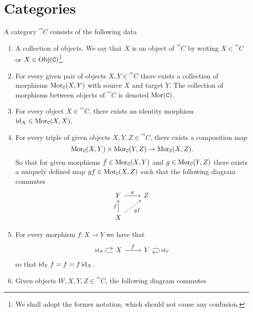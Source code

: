 \section{Categories}

\begin{definition}[Category]\label{def: category}
    A category \(\cat C\) consists of the following data
    \begin{enumerate}[(C1)]
        \item A collection of objects. We say that \(X\) is an object of \(\cat C\)
              by writing \(X \in \cat C\) or \(X \in \operatorname{Obj}(\texttt C)\)\footnote{We shall adopt
                  the former notation, which should not cause any confusion.}.
        \item For every given pair of objects \(X, Y \in \cat C\) there exists a
              collection of morphisms \(\operatorname{Mor}_{\texttt C}(X, Y)\) with source \(X\) and
              target \(Y\). The collection of morphisms between objects of \(\cat C\) is
              denoted \(\operatorname{Mor}(\texttt C)\).
        \item For every object \(X \in \cat C\), there exists an identity morphism
              \(\operatorname{id}_X \in \operatorname{Mor}_{\texttt C}(X, X)\).
        \item For every triple of given objects \(X, Y, Z \in \cat C\), there exists
              a composition map
              \[
                  \operatorname{Mor}_{\texttt C}(X, Y) \times \operatorname{Mor}_{\texttt C}(Y, Z) \to \operatorname{Mor}_{\texttt C}(X, Z).
              \]
              So that for given morphisms \(f \in \operatorname{Mor}_{\texttt C}(X, Y)\) and \(g \in
              \operatorname{Mor}_{\texttt C}(Y, Z)\) there exists a uniquely defined map \(g  f \in
              \operatorname{Mor}_{\texttt C}(X, Z)\) such that the following diagram commutes
              \[
                  \begin{tikzcd}
                      Y \ar[r, "g"]
                      &Z \\
                      X \ar[u, "f"] \ar[ru, dashed, swap, "g  f"]
                  \end{tikzcd}
              \]
        \item For every morphism \(f: X \to Y\) we have that
              \[
                  \begin{tikzcd}
                      X \ar[r, "f"] \ar[loop left, "\Id_X"] &Y \ar[loop right, "\Id_Y"]
                  \end{tikzcd}
              \]
              so that \(\operatorname{id}_Y  f = f = f  \operatorname{id}_X\).
        \item Given objects \(W, X, Y, Z \in \cat C\), the following diagram commutes

\end{enumerate}
\end{definition}
